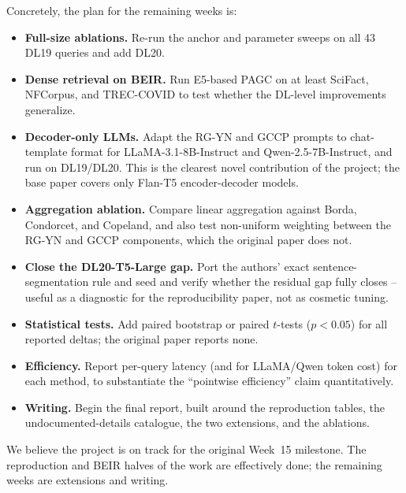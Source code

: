 \documentclass[conference]{IEEEtran}
\begin{document}
Concretely, the plan for the remaining weeks is:
\begin{itemize}[nosep,leftmargin=1em]
    \item \textbf{Full-size ablations.} Re-run the anchor and parameter sweeps on all 43 DL19 queries and add DL20.
    \item \textbf{Dense retrieval on BEIR.} Run E5-based PAGC on at least SciFact, NFCorpus, and TREC-COVID to test whether the DL-level improvements generalize.
    \item \textbf{Decoder-only LLMs.} Adapt the RG-YN and GCCP prompts to chat-template format for LLaMA-3.1-8B-Instruct and Qwen-2.5-7B-Instruct, and run on DL19/DL20. This is the clearest novel contribution of the project; the base paper covers only Flan-T5 encoder-decoder models.
    \item \textbf{Aggregation ablation.} Compare linear aggregation against Borda, Condorcet, and Copeland, and also test non-uniform weighting between the RG-YN and GCCP components, which the original paper does not.
    \item \textbf{Close the DL20-T5-Large gap.} Port the authors' exact sentence-segmentation rule and seed and verify whether the residual gap fully closes -- useful as a diagnostic for the reproducibility paper, not as cosmetic tuning.
    \item \textbf{Statistical tests.} Add paired bootstrap or paired $t$-tests ($p < 0.05$) for all reported deltas; the original paper reports none.
    \item \textbf{Efficiency.} Report per-query latency (and for LLaMA/Qwen token cost) for each method, to substantiate the ``pointwise efficiency'' claim quantitatively.
    \item \textbf{Writing.} Begin the final report, built around the reproduction tables, the undocumented-details catalogue, the two extensions, and the ablations.
\end{itemize}

We believe the project is on track for the original Week~15 milestone. The reproduction and BEIR halves of the work are effectively done; the remaining weeks are extensions and writing.



\end{document}
